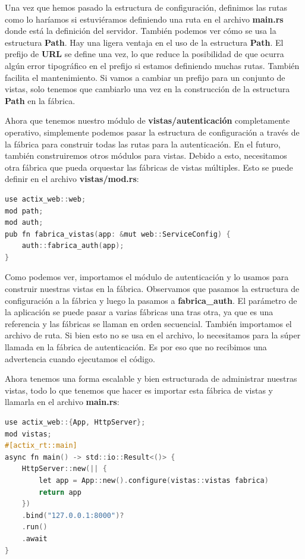 Una vez que hemos pasado la estructura de configuración, definimos las rutas como lo haríamos si estuviéramos definiendo una ruta en el archivo \textbf{main.rs} donde está la definición del servidor. También podemos ver cómo se usa la estructura \textbf{Path}. Hay una ligera ventaja en el uso de la estructura \textbf{Path}. El prefijo de \textbf{URL} se define una vez, lo que reduce la posibilidad de que ocurra algún error tipográfico en el prefijo si estamos definiendo muchas rutas. También facilita el mantenimiento. Si vamos a cambiar un prefijo para un conjunto de vistas, solo tenemos que cambiarlo una vez en la construcción de la estructura \textbf{Path} en la fábrica.

Ahora que tenemos nuestro módulo de \textbf{vistas/autenticación} completamente operativo, simplemente podemos pasar la estructura de configuración a través de la fábrica para construir todas las rutas para la autenticación. En el futuro, también construiremos otros módulos para vistas. Debido a esto, necesitamos otra fábrica que pueda orquestar las fábricas de vistas múltiples. Esto se puede definir en el archivo \textbf{vistas/mod.rs}:

\begin{lstlisting}[language=C]
use actix_web::web;
mod path;
mod auth;
pub fn fabrica_vistas(app: &mut web::ServiceConfig) {
	auth::fabrica_auth(app);
}
\end{lstlisting}

Como podemos ver, importamos el módulo de autenticación y lo usamos para construir nuestras vistas en la fábrica. Observamos que pasamos la estructura de configuración a la fábrica y luego la pasamos a \textbf{fabrica\_auth}. El parámetro de la aplicación se puede pasar a varias fábricas una tras otra, ya que es una referencia y las fábricas se llaman en orden secuencial. También importamos el archivo de ruta. Si bien esto no se usa en el archivo, lo necesitamos para la súper llamada en la fábrica de autenticación. Es por eso que no recibimos una advertencia cuando ejecutamos el código.

Ahora tenemos una forma escalable y bien estructurada de administrar nuestras vistas, todo lo que tenemos que hacer es importar esta fábrica de vistas y llamarla en el archivo \textbf{main.rs}:

\begin{lstlisting}[language=C]
use actix_web::{App, HttpServer};
mod vistas;
#[actix_rt::main]
async fn main() -> std::io::Result<()> {
	HttpServer::new(|| {
		let app = App::new().configure(vistas::vistas fabrica)
		return app
	})
	.bind("127.0.0.1:8000")?
	.run()
	.await
}
\end{lstlisting}

